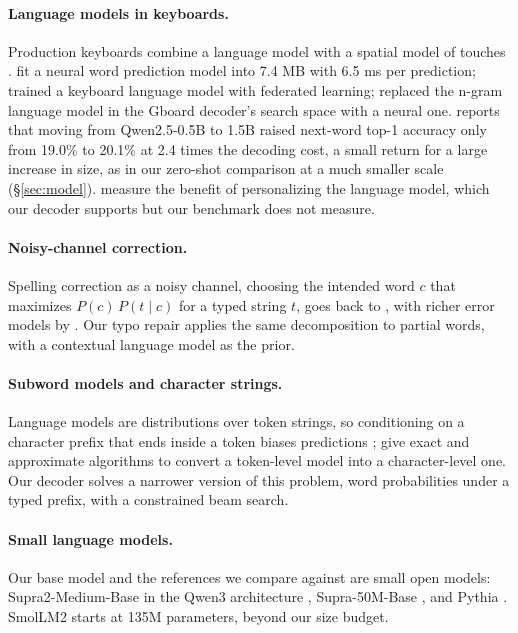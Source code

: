 \documentclass[11pt]{article}
\begin{document}
\paragraph{Language models in keyboards.} Production keyboards combine a language model with a spatial model of
touches \citep{goodman-etal-2002-language,fowler-etal-2015-effects}. \citet{yu-etal-2018-device} fit a neural word
prediction model into 7.4 MB with 6.5 ms per prediction; \citet{hard-etal-2018-federated} trained a keyboard
language model with federated learning; \citet{zhang-etal-2024-neural} replaced the n-gram language model in the
Gboard decoder's search space with a neural one. \citet{lexo-2026} reports that moving from Qwen2.5-0.5B to 1.5B
raised next-word top-1 accuracy only from 19.0\% to 20.1\% at 2.4 times the decoding cost, a small return for a large
increase in size, as in our zero-shot comparison at a much smaller scale (\S\ref{sec:model}).
\citet{fowler-etal-2015-effects} measure the benefit of personalizing the language model, which our decoder supports
but our benchmark does not measure.

\paragraph{Noisy-channel correction.} Spelling correction as a noisy channel, choosing the intended word $c$ that
maximizes $P(c)\,P(t \mid c)$ for a typed string $t$, goes back to \citet{kernighan-etal-1990-spelling}, with richer
error models by \citet{brill-moore-2000-improved}. Our typo repair applies the same decomposition to partial words,
with a contextual language model as the prior.

\paragraph{Subword models and character strings.} Language models are distributions over token strings, so
conditioning on a character prefix that ends inside a token biases predictions
\citep{phan-etal-2024-understanding}; \citet{vieira-etal-2024-language} give exact and approximate algorithms to
convert a token-level model into a character-level one. Our decoder solves a narrower version of this problem, word
probabilities under a typed prefix, with a constrained beam search.

\paragraph{Small language models.} Our base model and the references we compare against are small open models:
Supra2-Medium-Base \citep{supra2-medium-2026} in the Qwen3 architecture \citep{qwen3-2025}, Supra-50M-Base
\citep{supra-50m-2026}, and Pythia \citep{biderman-etal-2023-pythia}. SmolLM2 \citep{allal-etal-2025-smollm2} starts
at 135M parameters, beyond our size budget.
\end{document}

